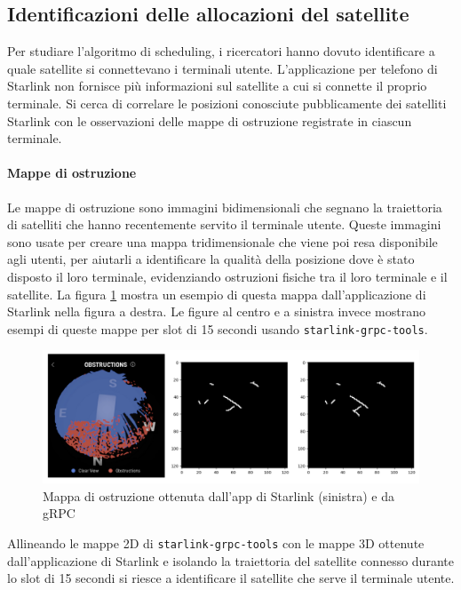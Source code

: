 \subsection{Identificazioni delle allocazioni del satellite}
Per studiare l'algoritmo di scheduling, i ricercatori hanno dovuto identificare a quale satellite si connettevano i terminali utente.
L'applicazione per telefono di Starlink non fornisce più informazioni sul satellite a cui si connette il proprio terminale.
Si cerca di correlare le posizioni conosciute pubblicamente dei satelliti Starlink con le osservazioni delle mappe di ostruzione registrate in ciascun terminale.

\paragraph{Mappe di ostruzione}
Le mappe di ostruzione sono immagini bidimensionali che segnano la traiettoria di satelliti che hanno recentemente servito il terminale utente.
Queste immagini sono usate per creare una mappa tridimensionale che viene poi resa disponibile agli utenti, per aiutarli a identificare la qualità della posizione dove è stato disposto il loro terminale, evidenziando ostruzioni fisiche tra il loro terminale e il satellite.
La figura \ref{fig:obstruction-maps} mostra un esempio di questa mappa dall'applicazione di Starlink nella figura a destra.
Le figure al centro e a sinistra invece mostrano esempi di queste mappe per slot di 15 secondi usando \verb|starlink-grpc-tools|\cite{sparky8512_starlink-grpc-tools_nodate}.

\begin{figure}[htbp]
  \centering
  \includegraphics[width=0.7\linewidth]{./res/img/obstruction_maps.png}
  \caption{Mappa di ostruzione ottenuta dall'app di Starlink (sinistra) e da gRPC \cite{sparky8512_starlink-grpc-tools_nodate}\cite{tanveer_making_2023}}
  \label{fig:obstruction-maps}
\end{figure}

Allineando le mappe 2D di \verb|starlink-grpc-tools| con le mappe 3D ottenute dall'applicazione di Starlink e isolando la traiettoria del satellite connesso durante lo slot di 15 secondi si riesce a identificare il satellite che serve il terminale utente.

